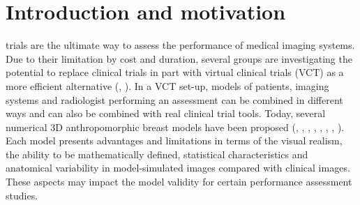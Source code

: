 \documentclass[journal]{IEEEtran}
\begin{document}
%
\IEEEpeerreviewmaketitle

\section{Introduction and motivation}
\label{sec:intr-motiv}

%
%
%
%

 trials are the ultimate way to assess the
performance of medical imaging systems. Due to their limitation by
cost and duration, several groups are investigating the potential to
replace clinical trials in part with virtual clinical trials (VCT) as
a more efficient alternative (\cite{maidment2014virtual},
\cite{kiarashi2014towards}). In a VCT set-up, models of patients,
imaging systems and radiologist performing an assessment can be
combined in different ways and can also be combined with real clinical
trial tools. Today, several numerical 3D anthropomorphic breast models
have been proposed (\cite{li2009methodology}, \cite{mahr2012three},
\cite{carton2014virtual}, \cite{bakic2014realistic},
\cite{chen2015description}, \cite{graff2016new},
\cite{elangovan2017design}, \cite{sturgeon2017synthetic}). Each model
presents advantages and limitations in terms of the visual realism,
the ability to be mathematically defined, statistical characteristics
and anatomical variability in model-simulated images compared with
clinical images. These aspects may impact the model validity for
certain performance assessment studies.
\end{document}
